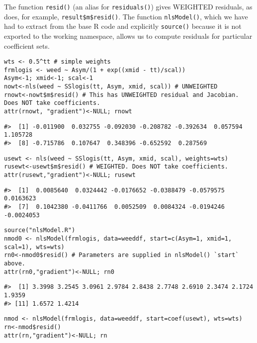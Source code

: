 The function \texttt{resid()} (an alias for \texttt{residuals()}) gives WEIGHTED residuals,
as does, for example, \texttt{result\$m\$resid()}. The function \texttt{nlsModel()}, which we
have had to extract from the base R code and explicitly \texttt{source()} because it
is not exported to the working namespace,
allows us to compute residuals for particular coefficient sets.

\begin{verbatim}
wts <- 0.5^tt # simple weights
frmlogis <- weed ~ Asym/(1 + exp((xmid - tt)/scal))
Asym<-1; xmid<-1; scal<-1
nowt<-nls(weed ~ SSlogis(tt, Asym, xmid, scal)) # UNWEIGHTED
rnowt<-nowt$m$resid() # This has UNWEIGHTED residual and Jacobian. Does NOT take coefficients.
attr(rnowt, "gradient")<-NULL; rnowt
\end{verbatim}

\begin{verbatim}
#>  [1] -0.011900  0.032755 -0.092030 -0.208782 -0.392634  0.057594  1.105728
#>  [8] -0.715786  0.107647  0.348396 -0.652592  0.287569
\end{verbatim}

\begin{verbatim}
usewt <- nls(weed ~ SSlogis(tt, Asym, xmid, scal), weights=wts)
rusewt<-usewt$m$resid() # WEIGHTED. Does NOT take coefficients.
attr(rusewt,"gradient")<-NULL; rusewt
\end{verbatim}

\begin{verbatim}
#>  [1]  0.0085640  0.0324442 -0.0176652 -0.0388479 -0.0579575  0.0163623
#>  [7]  0.1042380 -0.0411766  0.0052509  0.0084324 -0.0194246 -0.0024053
\end{verbatim}

\begin{verbatim}
source("nlsModel.R")
nmod0 <- nlsModel(frmlogis, data=weeddf, start=c(Asym=1, xmid=1, scal=1), wts=wts)
rn0<-nmod0$resid() # Parameters are supplied in nlsModel() `start` above.
attr(rn0,"gradient")<-NULL; rn0
\end{verbatim}

\begin{verbatim}
#>  [1] 3.3998 3.2545 3.0961 2.9784 2.8438 2.7748 2.6910 2.3474 2.1724 1.9359
#> [11] 1.6572 1.4214
\end{verbatim}

\begin{verbatim}
nmod <- nlsModel(frmlogis, data=weeddf, start=coef(usewt), wts=wts)
rn<-nmod$resid()
attr(rn,"gradient")<-NULL; rn
\end{verbatim}

